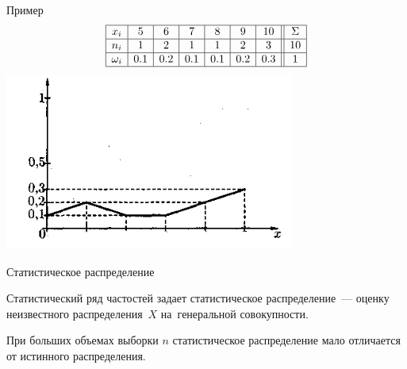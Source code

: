 \documentclass[unicode,11pt,notheorems,xcolor=table]{beamer}
\begin{document}
\begin{frame}{Пример}{}
    $$
    \begin{array}{|c|c|c|c|c|c|c||c|}
        \hline
        x_i & 5 & 6 & 7 & 8 & 9 & 10 & \Sigma\\
        \hline
        n_i & 1 & 2 & 1 & 1 & 2& 3& 10\\
        \hline
        \omega_i & 0.1 & 0.2 & 0.1 & 0.1 & 0.2& 0.3& 1\\
        \hline
    \end{array}
    $$
    \bigskip 
    \centering\includegraphics[width=9.5cm]{polygon-1.png}

\end{frame}

\begin{frame}{Статистическое распределение}{}

    \begin{block}{}
    Статистический ряд частостей задает 
    \alert{статистическое распределение}~--- оценку неизвестного распределения~$X$ на~генеральной совокупности. 
    \end{block}
    \vfill
    При больших объемах выборки $n$ статистическое распределение мало отличается от истинного распределения.

    
        

\end{frame}
\end{document}
